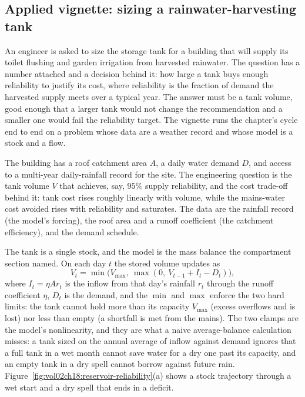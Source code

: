 \subsection{Applied vignette: sizing a rainwater-harvesting tank}

An engineer is asked to size the storage tank for a building that will
supply its toilet flushing and garden irrigation from harvested rainwater.
The question has a number attached and a decision behind it: how large a
tank buys enough reliability to justify its cost, where reliability is the
fraction of demand the harvested supply meets over a typical year. The
answer must be a tank volume, good enough that a larger tank would not
change the recommendation and a smaller one would fail the reliability
target. The vignette runs the chapter's cycle end to end on a problem whose
data are a weather record and whose model is a stock and a flow.

 The building has a roof catchment area
$A$, a daily water demand $D$, and access to a multi-year daily-rainfall
record for the site. The engineering question is the tank volume $V$ that
achieves, say, $95\%$ supply reliability, and the cost trade-off behind it:
tank cost rises roughly linearly with volume, while the mains-water cost
avoided rises with reliability and saturates. The data are the rainfall
record (the model's forcing), the roof area and a runoff coefficient (the
catchment efficiency), and the demand schedule.

 The tank is a single stock, and the model is
the mass balance the compartment section named. On each day $t$ the stored
volume updates as
\[
V_t = \min\!\bigl(V_{\max},\ \max(0,\ V_{t-1} + I_t - D_t)\bigr),
\]
where $I_t = \eta A r_t$ is the inflow from that day's rainfall $r_t$
through the runoff coefficient $\eta$, $D_t$ is the demand, and the
$\min$ and $\max$ enforce the two hard limits: the tank cannot hold more
than its capacity $V_{\max}$ (excess overflows and is lost) nor less than
empty (a shortfall is met from the mains). The two clamps are the model's
nonlinearity, and they are what a naive average-balance calculation misses:
a tank sized on the annual average of inflow against demand ignores that a
full tank in a wet month cannot save water for a dry one past its capacity,
and an empty tank in a dry spell cannot borrow against future rain.
Figure~\ref{fig:vol02ch18:reservoir-reliability}(a) shows a stock
trajectory through a wet start and a dry spell that ends in a deficit.

